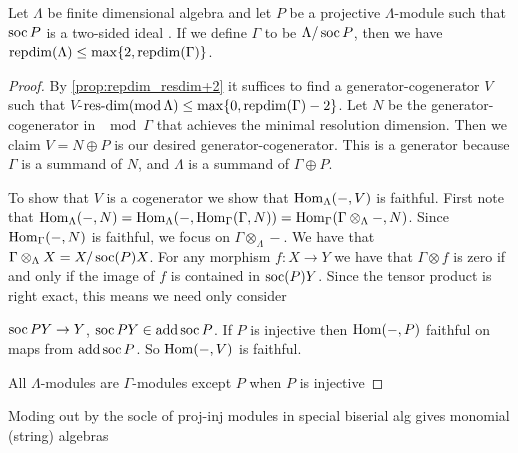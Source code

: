 \begin{theorem}
	Let $\Lambda$ be finite dimensional algebra and let $P$ be a projective $\Lambda$-module such that $\operatorname{soc} P$ is a two-sided ideal . If we define $\Gamma$ to be $\Lambda / \operatorname{soc} P$, then we have $\operatorname{repdim}(\Lambda) \leq \max\{2, \operatorname{repdim}(\Gamma)\}$. 
	\begin{proof}
		By \cref{prop:repdim_resdim+2} it suffices to find a generator-cogenerator $V$ such that $V$-$\operatorname{res-dim}(\operatorname{mod} \Lambda) \leq \max\{0, \operatorname{repdim}(\Gamma)-2\}$. Let $N$ be the generator-cogenerator in $\mod\Gamma$ that achieves the minimal resolution dimension. Then we claim $V = N \oplus P$ is our desired generator-cogenerator. This is a generator because $\Gamma$ is a summand of $N$, and $\Lambda$ is a summand of $\Gamma \oplus P$.
		
		To show that $V$ is a cogenerator we show that $\operatorname{Hom}_\Lambda(-, V)$ is faithful. First note that $\operatorname{Hom}_\Lambda(-, N) = \operatorname{Hom}_\Lambda(-, \operatorname{Hom}_\Gamma(\Gamma, N)) = \operatorname{Hom}_\Gamma(\Gamma \otimes_\Lambda -, N)$. Since $\operatorname{Hom}_\Gamma(-, N)$ is faithful, we focus on $\Gamma \otimes_\Lambda -$. We have that $\Gamma\otimes_\Lambda X = X/\operatorname{soc} (P)X$. For any morphism $f\colon X \to Y$ we have that $\Gamma \otimes f$ is zero if and only if the image of $f$ is contained in $\operatorname{soc} (P)Y$. Since the tensor product is right exact, this means we need only consider 
		
		$\operatorname{soc} PY \to Y$, $\operatorname{soc} P Y \in \operatorname{add} \operatorname{soc} P$. If $P$ is injective then $\operatorname{Hom}(-, P)$ faithful on maps from $\operatorname{add}\operatorname{soc} P$. So $\operatorname{Hom}(-, V)$ is faithful.
		
		All $\Lambda$-modules are $\Gamma$-modules except $P$ when $P$ is injective\todo{!}
	\end{proof}
\end{theorem}

Moding out by the socle of proj-inj modules in special biserial alg gives monomial (string) algebras 